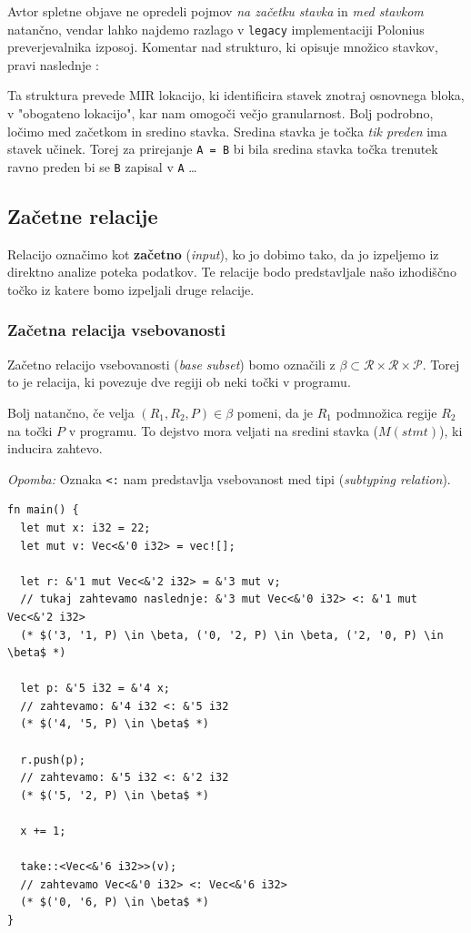 \documentclass{article}
\begin{document}
Avtor spletne objave ne opredeli pojmov \textit{na začetku stavka} in \textit{med stavkom} natančno,
vendar lahko najdemo razlago v \verb|legacy| implementaciji Polonius preverjevalnika izposoj.
Komentar nad strukturo, ki opisuje množico stavkov, pravi naslednje \cite{RustCompilerRustc_borrowcka}:

\begin{displayquote}
	Ta struktura prevede MIR lokacijo, ki identificira stavek znotraj osnovnega bloka, v "obogateno lokacijo",
	kar nam omogoči večjo granularnost. Bolj podrobno, ločimo med začetkom in sredino stavka. Sredina stavka
	je točka \textit{tik preden} ima stavek učinek. Torej za prirejanje \verb|A = B| bi bila sredina stavka
	točka trenutek ravno preden bi se \verb|B| zapisal v \verb|A| \dots
\end{displayquote}

\subsection{Začetne relacije}

Relacijo označimo kot \textbf{začetno} (\textit{input}), ko jo dobimo tako, da jo izpeljemo
iz direktno analize poteka podatkov. Te relacije bodo predstavljale našo izhodiščno točko iz katere bomo izpeljali druge relacije.


\subsubsection{Začetna relacija vsebovanosti}

Začetno relacijo vsebovanosti (\textit{base subset}) bomo označili z
$\beta \subset \mathcal{R} \times \mathcal{R} \times \mathcal{P}$. Torej to je relacija, ki povezuje dve regiji
ob neki točki v programu.

Bolj natančno, če velja $(R_{1}, R_{2}, P) \in \beta$ pomeni, da je $R_{1}$ podmnožica regije $R_{2}$ na točki $P$ v programu.
To dejstvo mora veljati na sredini stavka ($M(stmt)$), ki inducira zahtevo.

\textit{Opomba:} Oznaka \verb|<:| nam predstavlja vsebovanost med tipi (\textit{subtyping relation}).

\begin{lstlisting}
fn main() {
  let mut x: i32 = 22;
  let mut v: Vec<&'0 i32> = vec![];

  let r: &'1 mut Vec<&'2 i32> = &'3 mut v; 
  // tukaj zahtevamo naslednje: &'3 mut Vec<&'0 i32> <: &'1 mut Vec<&'2 i32> 
  (* $('3, '1, P) \in \beta, ('0, '2, P) \in \beta, ('2, '0, P) \in \beta$ *)

  let p: &'5 i32 = &'4 x; 
  // zahtevamo: &'4 i32 <: &'5 i32
  (* $('4, '5, P) \in \beta$ *)

  r.push(p);
  // zahtevamo: &'5 i32 <: &'2 i32
  (* $('5, '2, P) \in \beta$ *)

  x += 1;

  take::<Vec<&'6 i32>>(v);
  // zahtevamo Vec<&'0 i32> <: Vec<&'6 i32>
  (* $('0, '6, P) \in \beta$ *)
}
\end{lstlisting}
\end{document}
